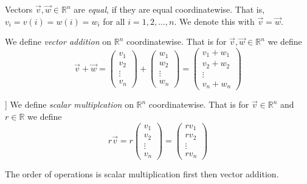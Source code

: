 \begin{definition}
Vectors $\vec{v}, \vec{w} \in \mathbb{R}^n$ are \emph{equal},  if they are equal coordinatewise. That is, $v_i=v(i)=w(i)=w_i$ for all $i=1,2,\ldots, n$. We denote this with  $\vec{v}=\vec{w}$.
\end{definition}


\begin{definition}
We define \emph{vector addition} on $\mathbb{R}^n$ coordinatewise. That is for $\vec{v},\vec{w} \in \mathbb{R}^n$ we define
\[
\vec{v}+\vec{w}=
\begin{pmatrix}v_1\\ v_2 \\ \vdots \\ v_n\end{pmatrix}+
\begin{pmatrix}w_1\\ w_2 \\ \vdots \\ w_n\end{pmatrix}=
\begin{pmatrix}v_1+w_1\\ v_2+w_2 \\ \vdots \\ v_n+w_n\end{pmatrix}
\]
\end{definition}

\begin{definition}]
We define \emph{scalar multiplcation} on $\mathbb{R}^n$ coordinatewise. That is for $\vec{v} \in \mathbb{R}^n$ and $r \in \mathbb{R}$ we define
\[
r\vec{v}=
r\begin{pmatrix}v_1\\ v_2 \\ \vdots \\ v_n\end{pmatrix}=
\begin{pmatrix}rv_1\\ rv_2 \\ \vdots \\ rv_n\end{pmatrix}
\]
\end{definition}

The order of operations is scalar multiplication first then vector addition.

